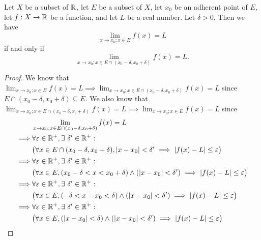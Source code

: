 \begin{prop}\label{9.3.18}
  Let \(X\) be a subset of \(\mathbb{R}\), let \(E\) be a subset of \(X\), let \(x_0\) be an adherent point of \(E\), let \(f : X \to \mathbb{R}\) be a function, and let \(L\) be a real number.
  Let \(\delta > 0\).
  Then we have
  \[
    \lim_{x \to x_0 ; x \in E} f(x) = L
  \]
  if and only if
  \[
    \lim_{x \to x_0 ; x \in E \cap (x_0 - \delta, x_0 + \delta)} f(x) = L.
  \]
\end{prop}

\begin{proof}
  We know that \(\lim_{x \to x_0 ; x \in E} f(x) = L \implies \lim_{x \to x_0 ; x \in E \cap (x_0 - \delta, x_0 + \delta)} f(x) = L\) since \(E \cap (x_0 - \delta, x_0 + \delta) \subseteq E\).
  We also know that \(\lim_{x \to x_0 ; x \in E \cap (x_0 - \delta, x_0 + \delta)} f(x) = L \implies \lim_{x \to x_0 ; x \in E} f(x) = L\) since
  \begin{align*}
             & \lim_{x \to x_0 ; x \in E \cap (x_0 - \delta, x_0 + \delta)} f(x) = L                                                                 \\
    \implies & \forall \varepsilon \in \R^+, \exists\ \delta' \in \R^+ :                                                                             \\
             & \big(\forall x \in E \cap (x_0 - \delta, x_0 + \delta), \abs{x - x_0} < \delta' \implies \abs{f(x) - L} \leq \varepsilon\big)         \\
    \implies & \forall \varepsilon \in \R^+, \exists\ \delta' \in \R^+ :                                                                             \\
             & \big(\forall x \in E, (x_0 - \delta < x < x_0 + \delta) \land (\abs{x - x_0} < \delta') \implies \abs{f(x) - L} \leq \varepsilon\big) \\
    \implies & \forall \varepsilon \in \R^+, \exists\ \delta' \in \R^+ :                                                                             \\
             & \big(\forall x \in E, (-\delta < x - x_0 < \delta) \land (\abs{x - x_0} < \delta') \implies \abs{f(x) - L} \leq \varepsilon\big)      \\
    \implies & \forall \varepsilon \in \R^+, \exists\ \delta' \in \R^+ :                                                                             \\
             & \big(\forall x \in E, (\abs{x - x_0} < \delta) \land (\abs{x - x_0} < \delta') \implies \abs{f(x) - L} \leq \varepsilon\big)          \\

\end{align*}
\end{proof}
